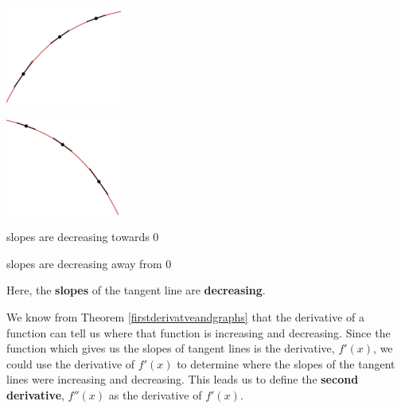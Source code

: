 \documentclass{ximera}
\begin{document}
\begin{center}

\begin{multicols}{2}

\includegraphics[width=1.5in]{./AppDerivativesGraphics/IncCD.png} 

\includegraphics[width=1.5in]{./AppDerivativesGraphics/DecCD.png} 

\end{multicols}

\end{center}

\begin{center}

\begin{multicols}{2}

slopes are decreasing towards $0$

slopes are decreasing away from $0$

\end{multicols}

\end{center}

Here, the \textbf{slopes} of the tangent line are \textbf{decreasing}.  

\medskip

We know from Theorem \ref{firstderivatveandgraphs} that the derivative of a function can tell us where that function is increasing and decreasing.  Since the function which gives us the slopes of tangent lines is the derivative, $f'(x)$, we could use the derivative of $f'(x)$ to determine where the slopes of the tangent lines were increasing and decreasing.  This leads us to define the \textbf{second derivative}, $f''(x)$  as the derivative of $f'(x)$.

\medskip
\end{document}
